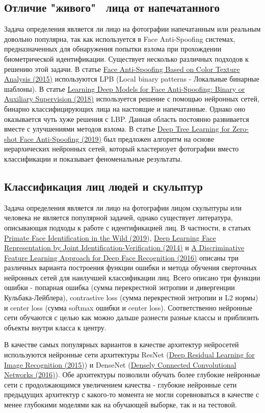 \documentclass[a4paper,14pt]{extarticle}
\newcommand{\bibref}[3]{\hyperlink{#1}{#2 (#3)}} %
\begin{document}
    \subsection{Отличие "живого" \, лица от напечатанного}
    Задача определения является ли лицо на фотографии напечатанным или реальным довольно популярна, так как используется в Face Anti-Spoofing системах, предназначенных для обнаружения попытки взлома при прохождении биометрической идентификации. Существует несколько различных подходов к решению этой задачи. В статье \bibref{lbp}{Face Anti-Spoofing Based on Color Texture Analysis}{2015} используются LPB (Local binary patterns - Локальные бинарные шаблоны). В статье \bibref{lbp2}{Learning Deep Models for Face Anti-Spoofing: Binary or Auxiliary Supervision}{2018} используется решение с помощью нейронных сетей, бинарно классифицирующих лица на настоящие и напечатанные. Однако оно оказывается чуть хуже решения с LBP. Данная область постоянно развивается вместе с улучшениями методов взлома. В статье \bibref{lbp3}{Deep Tree Learning for Zero-shot Face Anti-Spoofing}{2019} был предложен алгоритм на основе иерархических нейронных сетей, который кластеризует фотографии вместо классификации и показывает феноменальные результаты.
    \subsection{Классификация лиц людей и скульптур}
    Задача определения является ли лицо на фотографии лицом скульптуры или человека не является популярной задачей, однако существует литература, описывающая подходы к работе с идентификацией лиц. В частности, в статьях \bibref{pfid}{Primate Face Identification in the Wild}{2019}, \bibref{pfid2}{Deep Learning Face Representation by Joint Identification-Verification}{2014} и \bibref{pfid3}{A Discriminative Feature Learning Approach
    for Deep Face Recognition}{2016} описаны три различных варианта построения функции ошибки и метода обучения сверточных нейронных сетей для наилучшей классификации лиц. Всего описано три функции ошибки - попарная ошибка (сумма перекрестной энтропии и дивергенции Кульбака-Лейблера), contrastive loss (сумма перекрестной энтропии и L2 нормы) и center loss (сумма softmax ошибки и center loss). Соответственно нейронные сети обучаются с целью как можно дальше разнести разные классы и приблизить объекты внутри класса к центру.
    \par В качестве самых популярных вариантов в качестве архитектур нейросетей используются нейронные сети архитектуры ResNet (\bibref{resnet}{Deep Residual Learning for Image Recognition}{2015}) и DenseNet (\bibref{densenet}{Densely Connected Convolutional Networks}{2016}). Обе архитектуры позволили обучать более глубокие нейронные сети с продолжающимся увеличением качества - глубокие нейронные сети предыдущих архитектур с какого-то момента не могли соревноваться в качестве с менее глубокими моделями как на обучающей выборке, так и на тестовой.
\end{document}
